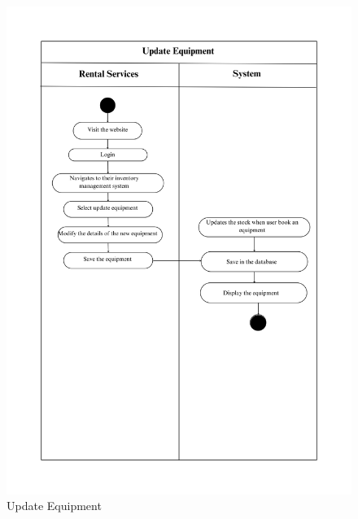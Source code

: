 \begin{figure}[h]
    \centering
    \includegraphics[width=1\textwidth]{Images/Activity Diagrams/21 Update Equipment.png}
    \caption{Update Equipment}
    \label{fig:activity-update-equ}
\end{figure}

